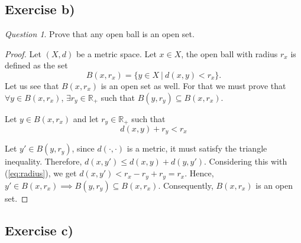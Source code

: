 \documentclass[11pt]{article}
\theoremstyle{definition}
\theoremstyle{remark}
\theoremstyle{remark}
\theoremstyle{remark}
\newtheorem*{question}{Question}
\begin{document}
\subsection*{Exercise b)}
\begin{question}
  Prove that any open ball is an open set.
\end{question}

\begin{proof}
  Let $(X, d)$ be a metric space. Let $x\in X$, the open ball with radius $r_x$
  is defined as the set
  \[
    B(x, r_x)=\{y\in X\ |\ d(x, y)<r_x\}.
  \]
  Let us see that $B(x, r_x)$ is an open set as well. For that we must prove
  that $\forall y\in B(x, r_x)$, $\exists r_y\in \mathbb{R}_+$ such that
  $B(y,r_y)\subseteq B(x, r_x)$.

  Let $y\in B(x, r_x)$ and let $r_y\in\mathbb{R}_+$ such that
  \begin{equation}\label{eq:radius}
    d(x,y) + r_y < r_x
  \end{equation}

  Let $y'\in B(y, r_y)$, since $d(\cdot,\cdot)$ is a metric, it must satisfy the
  triangle inequality. Therefore, $d(x,y')\leq d(x,y)+d(y, y')$. Considering
  this with (\ref{eq:radius}), we get $d(x,y')<r_x-r_y+r_y=r_x$. Hence,
  $y'\in B(x, r_x) \implies B(y,r_y)\subseteq B(x, r_x)$. Consequently,
  $B(x, r_x)$ is an open set.
\end{proof}

\subsection*{Exercise c)}
\end{document}

